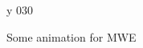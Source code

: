 \documentclass[12pt,letterpaper,oneside,titlepage]{article}
\begin{document}
\begin{landscape}
\begin{figure}[h]
%
{y}%
{0}{30}%
 \caption{Some animation for MWE}
\end{figure}
\end{landscape}

\end{document}
